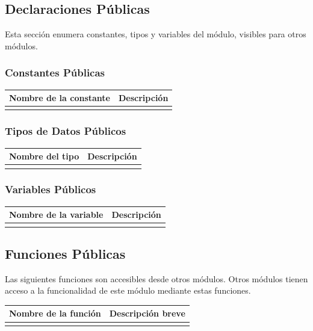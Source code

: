 \documentclass[a4paper,10pt]{article}
\begin{document}
\subsection{Declaraciones Públicas}
Esta sección enumera constantes, tipos y variables del módulo, visibles para
otros módulos.
\subsubsection{Constantes Públicas}
\begin{tabular}{| p{30mm} | p{10cm} |}
        \hline
        \textbf{Nombre de la \mbox{constante}} & \textbf{Descripción} \\
        \hline
         & \\
        \hline
\end{tabular}
                

\subsubsection{Tipos de Datos Públicos}
\begin{tabular}{| p{30mm} | p{10cm} |}
        \hline
        \textbf{Nombre del \mbox{tipo}} & \textbf{Descripción} \\
        \hline
         & \\
        \hline
\end{tabular}
\subsubsection{Variables Públicos}
\begin{tabular}{| p{30mm} | p{10cm} |}
        \hline
        \textbf{Nombre de la \mbox{variable}} & \textbf{Descripción} \\
        \hline
         & \\
        \hline
\end{tabular}
\subsection{Funciones Públicas}
Las siguientes funciones son accesibles desde otros módulos. Otros módulos
tienen acceso a la funcionalidad de este módulo mediante estas funciones.
~\\

\begin{tabular}{| p{30mm} | p{10cm} |}
        \hline
        \textbf{Nombre de la \mbox{función}} & \textbf{Descripción breve} \\
        \hline
         & \\
        \hline
\end{tabular}
\end{document}
